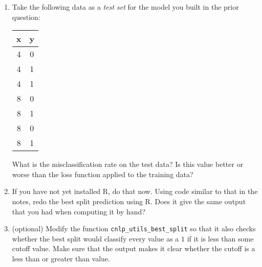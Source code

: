 \documentclass[12pt,hidelinks]{article}
\newcommand{\code}[1]{\texttt{#1}}
\numberwithin{equation}{section}
\begin{document}
\begin{enumerate}
\item Take the following data as a \textit{test set} for the model you built
in the prior question:

\begin{center}
\begin{tabular}{cc}
x & y \\ \hline
4 & 0 \\
4 & 1 \\
4 & 1 \\
8 & 0 \\
8 & 1 \\
8 & 0 \\
8 & 1 \\
\end{tabular}
\end{center}

What is the misclassification rate on the test data? Is this value better or
worse than the loss function applied to the training data?

\item If you have not yet installed R, do that now. Using code similar to that
in the notes, redo the best split prediction using R. Does it give the same
output that you had when computing it by hand?

\item (optional) Modify the function \code{cnlp\_utils\_best\_split} so that
it also checks whether the best split would classify every value as a $1$ if
it is less than some cutoff value. Make sure that the output makes it clear
whether the cutoff is a less than or greater than value.


\end{enumerate}
\end{document}
